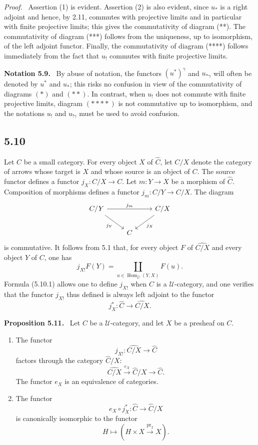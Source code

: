\documentclass[11pt]{article}
\newcommand{\U}{\mathcal{U}}
\newcommand{\Hom}{\operatorname{Hom}}
\newcommand{\pr}{\operatorname{pr}}
\newenvironment{statement}[1]{\par\medskip\noindent\textbf{#1.}\ }{\par\medskip}
\newenvironment{proofsketch}{\par\noindent\emph{Proof.}\ }{\par\medskip}
\begin{document}
\begin{proofsketch}
Assertion (1) is evident. Assertion (2) is also evident, since $u_*$ is a right adjoint and hence, by 2.11, commutes with projective limits and in particular with finite projective limits; this gives the commutativity of diagram (**). The commutativity of diagram (***) follows from the uniqueness, up to isomorphism, of the left adjoint functor. Finally, the commutativity of diagram (****) follows immediately from the fact that $u_!$ commutes with finite projective limits.
\end{proofsketch}

\begin{statement}{Notation 5.9}
By abuse of notation, the functors $(u^*)^\gamma$ and $u_{*\gamma}$ will often be denoted by $u^*$ and $u_*$; this risks no confusion in view of the commutativity of diagrams $(*)$ and $(**)$. In contrast, when $u_!$ does not commute with finite projective limits, diagram $(****)$ is not commutative up to isomorphism, and the notations $u_!$ and $u_{!\gamma}$ must be used to avoid confusion.
\end{statement}

\subsection*{5.10}
Let $C$ be a small category. For every object $X$ of $\widehat C$, let $C/X$ denote the category of arrows whose target is $X$ and whose source is an object of $C$. The source functor defines a functor $j_X:C/X\to C$. Let $m:Y\to X$ be a morphism of $\widehat C$. Composition of morphisms defines a functor $j_m:C/Y\to C/X$. The diagram
\[
\begin{tikzcd}
C/Y\arrow[rr,"j_m"]\arrow[dr,"j_Y"']&&C/X\arrow[dl,"j_X"]\\
&C&
\end{tikzcd}
\]
is commutative. It follows from 5.1 that, for every object $F$ of $\widehat{C/X}$ and every object $Y$ of $C$, one has
\[
\tag{5.10.1}
j_{X!}F(Y)=\coprod_{u\in\Hom_{\widehat C}(Y,X)}F(u).
\]
Formula (5.10.1) allows one to define $j_{X!}$ when $C$ is a $\U$-category, and one verifies that the functor $j_{X!}$ thus defined is always left adjoint to the functor
\[
j_X^*:\widehat C\longrightarrow\widehat{C/X}.
\]

\begin{statement}{Proposition 5.11}
Let $C$ be a $\U$-category, and let $X$ be a presheaf on $C$.
\begin{enumerate}[label=\arabic*)]
\item The functor
\[
j_{X!}:\widehat{C/X}\longrightarrow\widehat C
\]
factors through the category $\widehat C/X$:
\[
\widehat{C/X}\xrightarrow{e_X}\widehat C/X\longrightarrow\widehat C.
\]
The functor $e_X$ is an equivalence of categories.
\item The functor
\[
e_X\circ j_X^*:\widehat C\longrightarrow\widehat C/X
\]
is canonically isomorphic to the functor
\[
H\longmapsto (H\times X\xrightarrow{\pr_2}X).
\]
\end{enumerate}
\end{statement}
\end{document}
